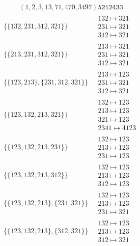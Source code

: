 \begin{scriptsize}
$$\begin{matrix}
\left(1, 2, 3, 13, 71, 470, 3497\right)
\texttt{A212433}
\end{matrix}
$$
\begin{align}
\{\{132, 231, 312, 321\}\}
\ 
&
\begin{matrix}
132 \mapsto 321\\231 \mapsto 321\\312 \mapsto 321
\end{matrix}
\\
\{\{213, 231, 312, 321\}\}
\ 
&
\begin{matrix}
213 \mapsto 321\\231 \mapsto 321\\312 \mapsto 321
\end{matrix}
\\
\{\{123, 213\}, \{231, 312, 321\}\}
\ 
&
\begin{matrix}
213 \mapsto 123\\231 \mapsto 321\\312 \mapsto 321
\end{matrix}
\\
\{\{123, 132, 213, 321\}\}
\ 
&
\begin{matrix}
132 \mapsto 123\\213 \mapsto 123\\321 \mapsto 123\\2341 \mapsto 4123
\end{matrix}
\\
\{\{123, 132, 213, 231\}\}
\ 
&
\begin{matrix}
132 \mapsto 123\\213 \mapsto 123\\231 \mapsto 123
\end{matrix}
\\
\{\{123, 132, 213, 312\}\}
\ 
&
\begin{matrix}
132 \mapsto 123\\213 \mapsto 123\\312 \mapsto 123
\end{matrix}
\\
\{\{123, 132, 213\}, \{231, 321\}\}
\ 
&
\begin{matrix}
132 \mapsto 123\\213 \mapsto 123\\231 \mapsto 321
\end{matrix}
\\
\{\{123, 132, 213\}, \{312, 321\}\}
\ 
&
\begin{matrix}
132 \mapsto 123\\213 \mapsto 123\\312 \mapsto 321

\end{matrix}
\end{align}
\end{scriptsize}
